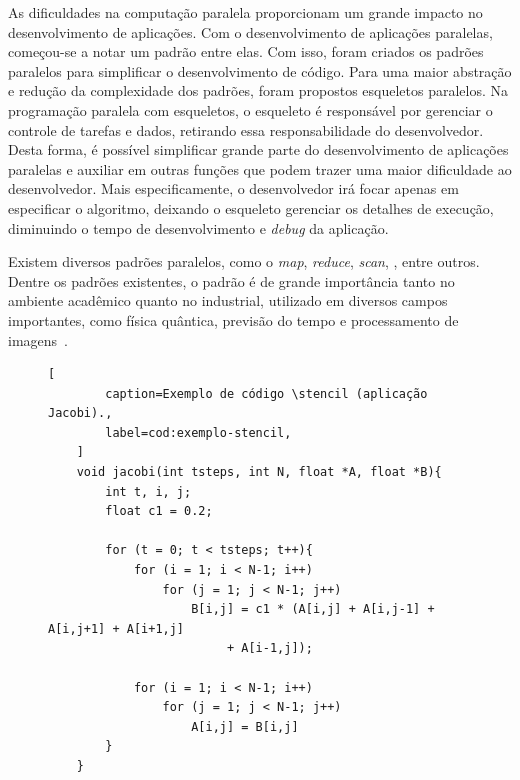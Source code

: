 As dificuldades na computação paralela proporcionam um grande impacto no desenvolvimento de aplicações. Com o
desenvolvimento de aplicações paralelas, começou-se a notar um padrão entre
elas. Com isso, foram criados os padrões paralelos para simplificar o
desenvolvimento de código.
Para uma maior abstração e redução da complexidade dos padrões, foram propostos
esqueletos paralelos. Na programação paralela com esqueletos, o esqueleto é responsável por
gerenciar o controle de tarefas e dados, retirando essa responsabilidade do
desenvolvedor. Desta forma, é possível simplificar grande parte do
desenvolvimento de aplicações paralelas e auxiliar em outras funções que podem
trazer uma maior dificuldade ao desenvolvedor. Mais especificamente, o
desenvolvedor irá focar apenas em especificar o algoritmo, deixando o esqueleto
gerenciar os detalhes de execução, diminuindo o tempo de desenvolvimento e
\textit{debug} da aplicação.

Existem diversos padrões paralelos, como o \textit{map}, \textit{reduce},
\textit{scan}, \stencil, entre outros. Dentre os padrões existentes, o
padrão \stencil é de grande importância tanto no ambiente acadêmico quanto no
industrial, utilizado em diversos campos importantes, como física quântica,
previsão do tempo e processamento de imagens~\cite{pereira15}.

\begin{figure}[t]
	\begin{lstlisting}[
		caption=Exemplo de código \stencil (aplicação Jacobi).,
		label=cod:exemplo-stencil,
	]
	void jacobi(int tsteps, int N, float *A, float *B){
		int t, i, j;
		float c1 = 0.2;

		for (t = 0; t < tsteps; t++){
			for (i = 1; i < N-1; i++)
				for (j = 1; j < N-1; j++)
					B[i,j] = c1 * (A[i,j] + A[i,j-1] + A[i,j+1] + A[i+1,j]
                         + A[i-1,j]);

			for (i = 1; i < N-1; i++)
				for (j = 1; j < N-1; j++)
					A[i,j] = B[i,j]
		}
	}
\end{lstlisting}
\end{figure}

